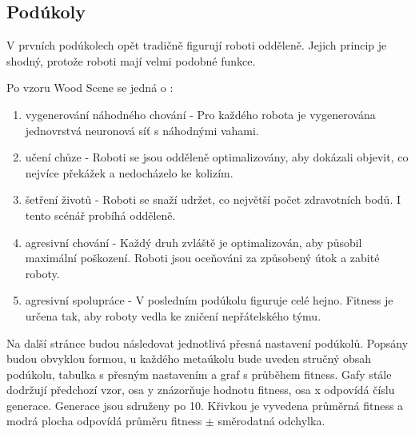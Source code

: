 \subsection*{Podúkoly}
V prvních podúkolech opět tradičně figurují roboti odděleně. Jejich princip je shodný, protože roboti mají velmi podobné funkce.
 \par 
Po vzoru Wood Scene se jedná o : 
\begin{enumerate}
	\item vygenerování náhodného chování - Pro každého robota je vygenerována jednovrstvá neuronová síť s náhodnými vahami. 
	\item učení chůze - Roboti se jsou odděleně optimalizovány, aby dokázali objevit, co nejvíce překážek a nedocházelo ke kolizím. 
	\item šetření životů - Roboti se snaží udržet, co  největší počet zdravotních bodů. I tento scénář probíhá odděleně. 
	\item agresivní chování - Každý druh zvláště je optimalizován, aby působil maximální poškození. Roboti jsou oceňováni za způsobený útok a zabité roboty. 
	\item agresivní spolupráce - V posledním podúkolu figuruje celé hejno. Fitness je určena tak, aby roboty vedla ke zničení nepřátelského týmu. 
\end{enumerate}
Na další stránce budou následovat jednotlivá přesná nastavení podúkolů. Popsány budou obvyklou formou, u každého metaúkolu bude uveden stručný obsah podúkolu, tabulka s přesným nastavením a graf s průběhem fitness. Gafy stále dodržují předchozí vzor, osa y znázorňuje hodnotu fitness, osa x odpovídá číslu generace. Generace jsou sdruženy po  10. Křivkou je vyvedena průměrná fitness a modrá plocha odpovídá průměru fitness $\pm$ směrodatná odchylka. 
\clearpage


